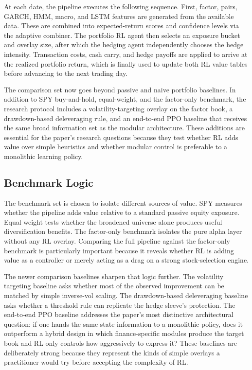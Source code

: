 \documentclass[11pt]{article}
\begin{document}
At each date, the pipeline executes the following sequence. First, factor, pairs,
GARCH, HMM, macro, and LSTM features are generated from the available data.
These are combined into expected-return scores and confidence levels via the
adaptive combiner. The portfolio RL agent then selects an exposure bucket and
overlay size, after which the hedging agent independently chooses the hedge
intensity. Transaction costs, cash carry, and hedge payoffs are applied to arrive
at the realized portfolio return, which is finally used to update both RL value
tables before advancing to the next trading day.

The comparison set now goes beyond passive and naive portfolio baselines. In
addition to SPY buy-and-hold, equal-weight, and the factor-only benchmark, the research
protocol includes a volatility-targeting overlay on the factor book, a
drawdown-based deleveraging rule, and an end-to-end PPO baseline that receives
the same broad information set as the modular architecture. These additions are
essential for the paper's research questions because they test whether RL adds
value over simple heuristics and whether modular control is preferable to a
monolithic learning policy.

\subsection{Benchmark Logic}

The benchmark set is chosen to isolate different sources of value. SPY measures
whether the pipeline adds value relative to a standard passive equity exposure.
Equal weight tests whether the broadened universe alone produces useful
diversification benefits. The factor-only benchmark isolates the pure alpha layer without any
RL overlay. Comparing the full pipeline against the factor-only benchmark is particularly
important because it reveals whether RL is adding value as a controller or merely
acting as a drag on a strong stock-selection engine.

The newer comparison baselines sharpen that logic further. The volatility
targeting baseline asks whether most of the observed improvement can be matched
by simple inverse-vol scaling. The drawdown-based deleveraging baseline asks
whether a threshold rule can replicate the hedge sleeve's protection. The
end-to-end PPO
baseline addresses the paper's most distinctive architectural question: if one
hands the same state information to a monolithic policy, does it outperform a
hybrid design in which finance-specific modules produce the target book and RL
only controls how aggressively to express it?
These baselines are deliberately strong because they represent the kinds of
simple overlays a practitioner would try before accepting the complexity of RL.
\end{document}
